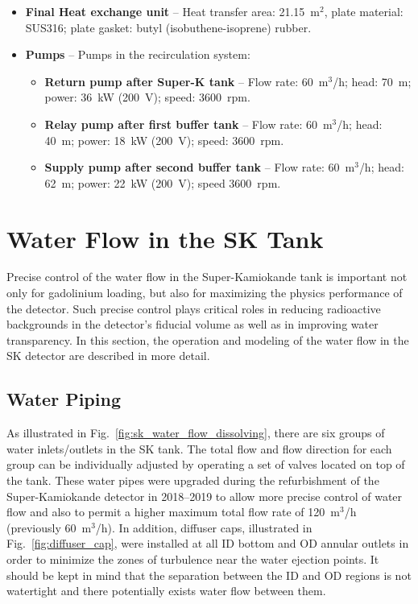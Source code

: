 \documentclass[preprint,12pt]{elsarticle}
\begin{document}
\begin{itemize}
    \item {\bf Final Heat exchange unit} -- Heat transfer area: 21.15~m$^2$, plate material: SUS316; plate gasket: butyl (isobuthene-isoprene) rubber.
     \item {\bf Pumps} --  Pumps in the recirculation system:
   \begin{itemize} 
        \item {\bf Return pump after Super-K tank} -- Flow rate: 60~m$^3$/h; head: 70~m; power: 36~kW (200~V); speed: 3600~rpm. 
        \item {\bf Relay pump after first buffer tank} -- Flow rate:  60~m$^3$/h; head: 40~m; power: 18~kW (200~V); speed: 3600~rpm. 
        \item {\bf Supply pump after second buffer tank} -- Flow rate: 60~m$^3$/h; head: 62~m; power: 22~kW (200~V); speed 3600~rpm. 
  \end{itemize}
\end{itemize}


\section{Water Flow in the SK Tank}
\label{Append:2}
Precise control of the water flow in the Super-Kamiokande tank is important not only for gadolinium loading, but also for maximizing the physics performance of the detector. Such precise control plays critical roles in reducing radioactive backgrounds in the detector's fiducial volume as well as in improving water transparency. In this section, the operation and modeling of the water flow in the SK detector are described in more detail.

\subsection{Water Piping}
As illustrated in Fig.~\ref{fig:sk_water_flow_dissolving}, there are six groups of water inlets/outlets in the SK tank. The total flow and flow direction for each group can be individually adjusted by operating a set of valves located on top of the tank. 
These water pipes were upgraded during the refurbishment of the Super-Kamiokande detector in 2018--2019 to allow more precise control of water flow and also to permit a higher maximum total 
flow rate of 120~m$^3$/h (previously 60~m$^3$/h).
In addition, diffuser caps, illustrated in Fig.~\ref{fig:diffuser_cap}, were installed at all ID bottom and OD annular outlets in order to minimize the zones of turbulence near the water ejection points. 
It should be kept in mind that the separation between the ID and OD regions is not watertight and there potentially exists water flow between them. 
\end{document}
